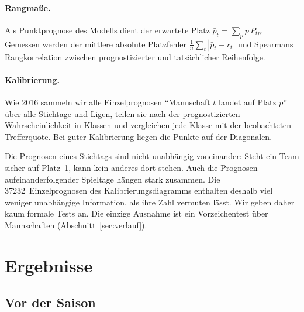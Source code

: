 \documentclass[11pt,a4paper,parskip=half,numbers=noenddot]{scrartcl}
\begin{document}
\paragraph{Rangmaße.} Als Punktprognose des Modells dient der erwartete
Platz $\bar p_t = \sum_p p\,P_{tp}$. Gemessen werden der mittlere absolute
Platzfehler $\frac1n\sum_t |\bar p_t - r_t|$ und Spearmans
Rangkorrelation zwischen prognostizierter und tatsächlicher Reihenfolge.

\paragraph{Kalibrierung.} Wie 2016 sammeln wir alle Einzelprognosen \enquote{Mannschaft $t$ landet auf Platz $p$} über alle Stichtage und Ligen, teilen sie
nach der prognostizierten Wahrscheinlichkeit in Klassen und vergleichen
jede Klasse mit der beobachteten Trefferquote. Bei guter Kalibrierung liegen
die Punkte auf der Diagonalen.

\begin{merke}
Die Prognosen eines Stichtags sind nicht unabhängig voneinander: Steht ein
Team sicher auf Platz~1, kann kein anderes dort stehen. Auch die Prognosen
aufeinanderfolgender Spieltage hängen stark zusammen. Die
\num{37232}~Einzelprognosen des Kalibrierungsdiagramms enthalten deshalb viel
weniger unabhängige Information, als ihre Zahl vermuten lässt. Wir geben
daher kaum formale Tests an. Die einzige Ausnahme ist ein Vorzeichentest
über Mannschaften (Abschnitt~\ref{sec:verlauf}).
\end{merke}

\section{Ergebnisse}

\subsection{Vor der Saison}\label{sec:vorsaison}
\end{document}
